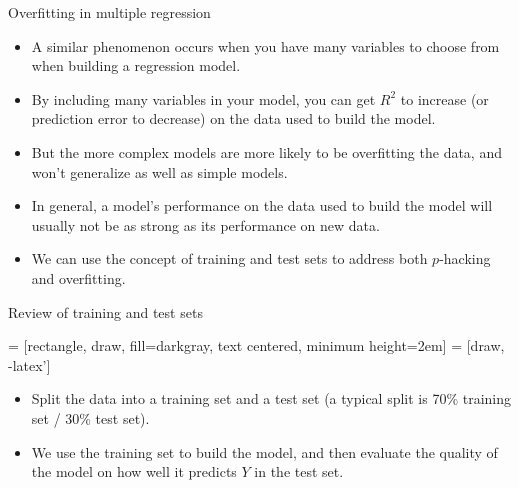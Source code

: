 \documentclass{beamer}\usepackage[]{graphicx}\usepackage[]{color}
\newenvironment{knitrout}{}{} %
\begin{document}
\begin{darkframes}
\begin{frame}
\begin{knitrout}


\end{knitrout}
    \end{frame}

    \begin{frame}{Overfitting in multiple regression}
      \begin{itemize}[<+->]
        \item A similar phenomenon occurs when you have many variables to choose from when building a regression model.
        \item By including many variables in your model, you can get $R^2$ to increase (or prediction error to decrease) on the data used to build the model.
        \item But the more complex models are more likely to be \alert{overfitting} the data, and won't generalize as well as simple models.
        \item In general, a model's performance on the data used to build the model will usually not be as strong as its performance on new data.
        \item We can use the concept of training and test sets to address both $p$-hacking and overfitting.
      \end{itemize}
    \end{frame}

    \begin{frame}{Review of training and test sets}
      \begin{center}
         = [rectangle, draw, fill=darkgray,
          text centered, minimum height=2em]
         = [draw, -latex']

      \end{center}

      \begin{itemize}
        \item Split the data into a \alert{training set} and a \alert{test set} (a typical split is 70\% training set / 30\% test set).
        \item We use the training set to build the model, and then evaluate the quality of the model on how well it predicts $Y$ in the test set.
      \end{itemize}
    \end{frame}


\end{darkframes}
\end{document}
